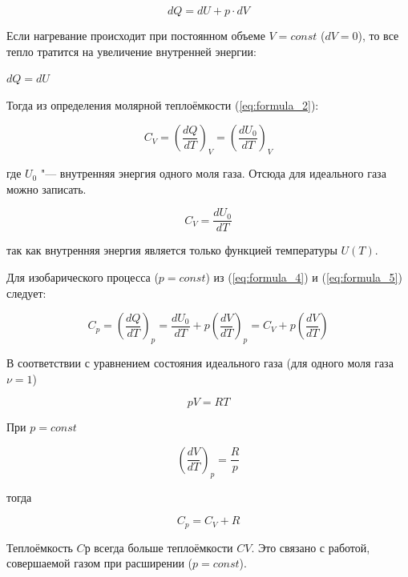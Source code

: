 \begin{equation}
    d Q = d U + p \cdot d V
    \label{eq:formula_4}
\end{equation}

Если нагревание происходит при постоянном объеме $V = const$ ($dV = 0$), то все тепло тратится на увеличение внутренней энергии:

$d Q = d U$

Тогда из определения молярной теплоёмкости (\ref{eq:formula_2}):


\begin{equation*}
    C_V = \left (\frac{d Q}{d T} \right)_V = \left (\frac{d U_0}{d T} \right )_V
\end{equation*}

где $U_0$ "--- внутренняя энергия одного моля газа. Отсюда для идеального газа можно записать.


\begin{equation}
    C_V = \frac{d U_0}{d T}
    \label{eq:formula_5}
\end{equation}

так как внутренняя энергия является только функцией температуры $U(T)$.

Для изобарического процесса ($p = const$) из (\ref{eq:formula_4}) и (\ref{eq:formula_5}) следует:

\begin{equation}
    C_p = \left (\frac{d Q}{d T} \right )_p = \frac{d U_0}{d T} + p \left (\frac{d V}{d T} \right )_p = C_V + p \left (\frac{d V}{d T} \right)
    \label{eq:formula_6}
\end{equation}

В соответствии с уравнением состояния идеального газа (для одного моля газа $\nu = 1$)

\begin{equation}
    p V = R T
    \label{eq:formula_7}
\end{equation}

При $p = const$

\begin{equation*}
    \left (\frac{d V}{d T} \right )_p = \frac{R}{p}
\end{equation*}

тогда

\begin{equation}
    C_p = C_V + R
    \label{eq:formula_8}
\end{equation}

Теплоёмкость $Cр$ всегда больше теплоёмкости $CV$. Это связано с работой, совершаемой газом при расширении ($p = const$).

